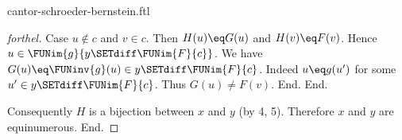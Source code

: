 \documentclass{naproche-library}
\begin{document}
\begin{smodule}[title=The Cantor-Schröder-Bernstein Theorem]{cantor-schroeder-bernstein.ftl}
\begin{proof}[forthel]
      Case $u \notin c$ and $v \in c$.
        Then $H(u) \eq G(u)$ and $H(v) \eq F(v)$.
        Hence $u \in \FUNim{g}{y \SETdiff \FUNim{F}{c}}$.
        We have $G(u) \eq \FUNinv{g}(u) \in y \SETdiff \FUNim{F}{c}$.
        Indeed $u \eq g(u')$ for some $u' \in y \SETdiff \FUNim{F}{c}$.
        Thus $G(u) \neq F(v)$.
      End.
    End.

    Consequently $H$ is a bijection between $x$ and $y$ (by 4, 5).
    Therefore $x$ and $y$ are equinumerous.
  End.
\end{proof}
\end{smodule}
\end{document}
